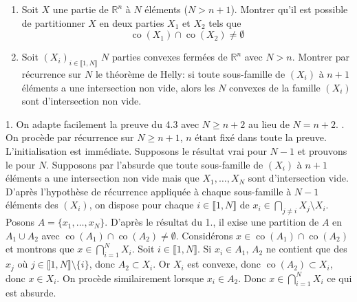 \documentclass{fancybook}
\DeclareMathOperator{\co}{co}
\begin{document}
\begin{exercice}
\begin{enumerate}
\item Soit $X$ une partie de $\mathbb R^n$ à $N$ éléments ($N>n+1$). Montrer qu'il est possible de partitionner $X$ en deux parties $X_1$ et $X_2$ tels que $$\co(X_1) \cap \co(X_2) \neq \emptyset$$
\item Soit $(X_i)_{i\in \llbracket 1,N \rrbracket }$ $N$ parties convexes fermées de $\mathbb R^n$ avec $N>n$.\newline
Montrer par récurrence sur $N$ le théorème de Helly: si toute sous-famille de $(X_i)$ à $n+1$ éléments  a une intersection non vide, alors les $N$ convexes de la famille $(X_i)$ sont d'intersection non vide.
\end{enumerate}  
\end{exercice}
1. On adapte facilement la preuve du 4.3 avec $N\geq n+2$ au lieu de $N=n+2$.
\newline {}. On procède par récurrence sur $N\geq n+1$, $n$ étant fixé dans toute la preuve.\newline
L'initialisation est immédiate. Supposons le résultat vrai pour $N-1$ et prouvons le pour $N$. Supposons par l'absurde que toute sous-famille de $(X_i)$ à $n+1$ éléments a une intersection non vide mais que $X_1,\ldots, X_N$ sont d'intersection vide.\newline
D'après l'hypothèse de récurrence appliquée à chaque sous-famille à $N-1$ éléments des $(X_i)$, on dispose pour chaque $i\in \llbracket 1,N \rrbracket$ de $x_i\in \bigcap_{j\neq i} X_j\setminus X_i$.\newline
Posons $A=\{x_1,\ldots,x_N\}$. D'après le résultat du 1., il exise une partition de $A$ en $A_1\cup A_2$ avec $\co(A_1)\cap \co(A_2)\neq \emptyset$.\newline
Considérons $x\in \co(A_1)\cap \co(A_2)$ et montrons que $x\in \bigcap_{i=1}^N X_i$. Soit $i\in \llbracket 1,N \rrbracket$. \newline
Si $x_i\in A_1$, $A_2$ ne contient que des $x_j$ où $j\in \llbracket 1,N \rrbracket\setminus \{i\}$, donc $A_2\subset X_i$. Or $X_i$ est convexe, donc $\co(A_2)\subset X_i$, donc $x\in X_i$. On procède similairement lorsque $x_i\in A_2$.\newline 
Donc $x\in \bigcap_{i=1}^N X_i$ ce qui est absurde.
\end{document}
